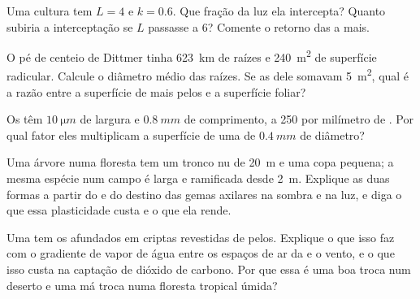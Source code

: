 \begin{exercise}[$\star\star$]\label{exo:b1:flowering-plant-organization:7}
Uma cultura tem $L = 4$ e $k = 0.6$. Que fração da luz ela intercepta?
Quanto subiria a interceptação se $L$ passasse a 6? Comente o retorno
das  a mais.
\end{exercise}

\begin{exercise}[$\star\star$]\label{exo:b1:flowering-plant-organization:8}
O pé de centeio de Dittmer tinha \qty{623}{km} de raízes e
\qty{240}{m^2} de superfície radicular. Calcule o diâmetro médio das
raízes. Se as  dele somavam \qty{5}{m^2}, qual é a razão entre a
superfície de  mais pelos e a superfície foliar?
\end{exercise}

\begin{exercise}[$\star\star$]\label{exo:b1:flowering-plant-organization:9}
Os  têm $\qty{10}{\micro m}$ de largura e
$\qty{0.8}{mm}$ de comprimento, a \qty{250}{} por milímetro de . Por
qual fator eles multiplicam a superfície de uma  de
$\qty{0.4}{mm}$ de diâmetro?
\end{exercise}

\begin{exercise}[$\star\star\star$]\label{exo:b1:flowering-plant-organization:10}
Uma árvore numa floresta tem um tronco nu de \qty{20}{m} e uma copa
pequena; a mesma espécie num campo é larga e ramificada desde
\qty{2}{m}. Explique as duas formas a partir do  e do
destino das gemas axilares na sombra e na luz, e diga o que essa
plasticidade custa e o que ela rende.
\end{exercise}

\begin{exercise}[$\star\star\star$]\label{exo:b1:flowering-plant-organization:11}
Uma  tem os  afundados em criptas revestidas de pelos.
Explique o que isso faz com o gradiente de vapor de água entre os
espaços de ar da  e o vento, e o que isso custa na captação de
dióxido de carbono. Por que essa é uma boa troca num deserto e uma má
troca numa floresta tropical úmida?
\end{exercise}

